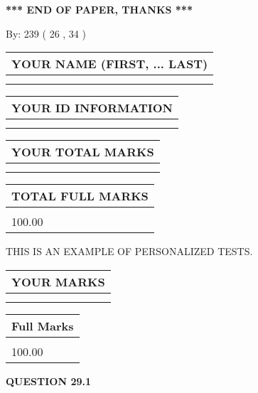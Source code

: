 \documentclass[12pt]{article}
\begin{document}
 

 
\vspace{0.3in}
   
   
 \vspace{0.2in}
 
   
   
   
   
\vspace{1.0in} 
{\textbf{\large{ *** END OF PAPER, THANKS *** }}} 
   
   
\hspace{1.0in} By: 
         239 (          26 ,           34 )
   
   
   
   
\newpage 
\setcounter{page}{ 
    29001 } 
   
   
   
   
\noindent\begin{tabular}{|l|}
\hline
YOUR NAME (FIRST, ... LAST)  \\
\hline
 \\ 
 \\ 
\hline
\end{tabular}
\hspace{0.05in} \begin{tabular}{|l|}
\hline
 YOUR   ID   INFORMATION  \\
\hline
 \\ 
 \\ 
\hline
\end{tabular}
   
   
\vspace{0.2in}\noindent\begin{tabular}{|l|}
\hline
YOUR TOTAL MARKS  \\
\hline
 \\ 
 \\ 
\hline
\end{tabular}
\hspace{0.05in} \begin{tabular}{|l|}
\hline
TOTAL FULL MARKS  \\
\hline
 \\ 
100.00 \\
\hline
\end{tabular}
   
   
 \vspace{0.2in}
{\Huge  THIS IS AN EXAMPLE OF}
{\Huge  PERSONALIZED TESTS. }
   
   
  
\vspace{0.2in}
  
\noindent\begin{tabular}{|l|}
\hline
 YOUR MARKS  \\
\hline
 \\ 
 \\ 
\hline
\end{tabular}
\hspace{0.05in} \begin{tabular}{|l|}
\hline
 Full Marks  \\
\hline
 \\ 
100.00 \\
\hline
\end{tabular}
{\textbf{\Large{QUESTION
29.1 
}}}
  
\end{document}
